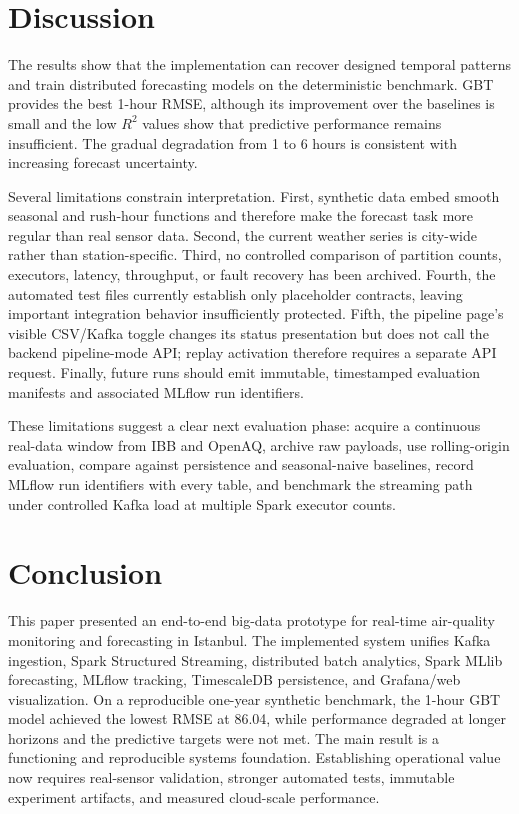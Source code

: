 \documentclass[conference]{IEEEtran}
\begin{document}
\section{Discussion}
The results show that the implementation can recover designed temporal
patterns and train distributed forecasting models on the deterministic
benchmark. GBT provides the best 1-hour RMSE, although its improvement over the
baselines is small and the low $R^2$ values show that predictive performance
remains insufficient. The gradual degradation from 1 to 6 hours is consistent
with increasing forecast uncertainty.

Several limitations constrain interpretation. First, synthetic data embed
smooth seasonal and rush-hour functions and therefore make the forecast task
more regular than real sensor data. Second, the current weather series is
city-wide rather than station-specific. Third, no controlled comparison of
partition counts, executors, latency, throughput, or fault recovery has been
archived. Fourth, the automated test files currently establish only placeholder
contracts, leaving important integration behavior insufficiently protected.
Fifth, the pipeline page's visible CSV/Kafka toggle changes its status
presentation but does not call the backend pipeline-mode API; replay activation
therefore requires a separate API request. Finally, future runs should emit
immutable, timestamped evaluation manifests and associated MLflow run
identifiers.

These limitations suggest a clear next evaluation phase: acquire a continuous
real-data window from IBB and OpenAQ, archive raw payloads, use rolling-origin
evaluation, compare against persistence and seasonal-naive baselines, record
MLflow run identifiers with every table, and benchmark the streaming path
under controlled Kafka load at multiple Spark executor counts.

\section{Conclusion}
This paper presented an end-to-end big-data prototype for real-time air-quality
monitoring and forecasting in Istanbul. The implemented system unifies Kafka
ingestion, Spark Structured Streaming, distributed batch analytics, Spark
MLlib forecasting, MLflow tracking, TimescaleDB persistence, and Grafana/web
visualization. On a reproducible one-year synthetic benchmark, the 1-hour GBT
model achieved the lowest RMSE at 86.04, while performance degraded at longer
horizons and the predictive targets were not met. The main result is a functioning and
reproducible systems foundation. Establishing operational value now requires
real-sensor validation, stronger automated tests, immutable experiment
artifacts, and measured cloud-scale performance.
\end{document}
